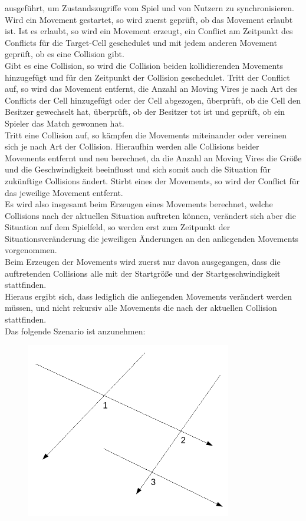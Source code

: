 ausgeführt, um Zustandszugriffe vom Spiel und von Nutzern zu synchronisieren. \\
Wird ein Movement gestartet, so wird zuerst geprüft, ob das Movement erlaubt ist. Ist es erlaubt, so wird ein Movement erzeugt, 
ein Conflict am Zeitpunkt des Conflicts für die Target-Cell geschedulet und mit jedem anderen Movement geprüft, ob es eine Collision gibt. \\
Gibt es eine Collision, so wird die Collision beiden kollidierenden Movements hinzugefügt und für den Zeitpunkt der Collision geschedulet.
Tritt der Conflict auf, so wird das Movement entfernt, die Anzahl an Moving Vires je nach Art des Conflicts der Cell hinzugefügt oder der Cell abgezogen,
überprüft, ob die Cell den Besitzer gewechselt hat, überprüft, ob der Besitzer tot ist und geprüft, ob ein Spieler das Match gewonnen hat. \\
Tritt eine Collision auf, so kämpfen die Movements miteinander oder vereinen sich je nach Art der Collision.
Hieraufhin werden alle Collisions beider Movements entfernt und neu berechnet, da die Anzahl an Moving Vires die Größe und die Geschwindigkeit beeinflusst und sich somit auch die Situation für zukünftige Collisions ändert.
Stirbt eines der Movements, so wird der Conflict für das jeweilige Movement entfernt. \\
Es wird also insgesamt beim Erzeugen eines Movements berechnet, welche Collisions nach der aktuellen Situation auftreten können, 
verändert sich aber die Situation auf dem Spielfeld, so werden erst zum Zeitpunkt der Situationsveränderung die jeweiligen Änderungen 
an den anliegenden Movements vorgenommen. \\
Beim Erzeugen der Movements wird zuerst nur davon ausgegangen, dass die auftretenden Collisions alle mit der Startgröße und der Startgeschwindigkeit stattfinden. \\
Hieraus ergibt sich, dass lediglich die anliegenden Movements verändert werden müssen, und nicht rekursiv alle Movements die nach der aktuellen Collision stattfinden. \\
Das folgende Szenario ist anzunehmen:
\begin{figure}[H]
	\centering
	\includegraphics[width=0.8\textwidth]{Collision.png}
\end{figure}
